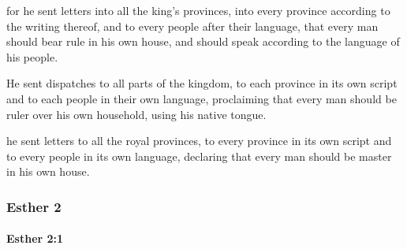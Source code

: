 			\begin{versebox}
					\item[BHS] 
					\item[LXX] 
					\item[ASV] for he sent letters into all the king's provinces, into every province according to the writing thereof, and to every people after their language, that every man should bear rule in his own house, and should speak according to the language of his people.
					\item[NIV] He sent dispatches to all parts of the kingdom, to each province in its own script and to each people in their own language, proclaiming that every man should be ruler over his own household, using his native tongue.
					\item[NRSV] he sent letters to all the royal provinces, to every province in its own script and to every people in its own language, declaring that every man should be master in his own house.
			\end{versebox}
	\subsubsection{Esther 2} %
		\label{ESTHER-2}

		\paragraph{Esther 2:1} %
			\label{ESTHER-2-1}

